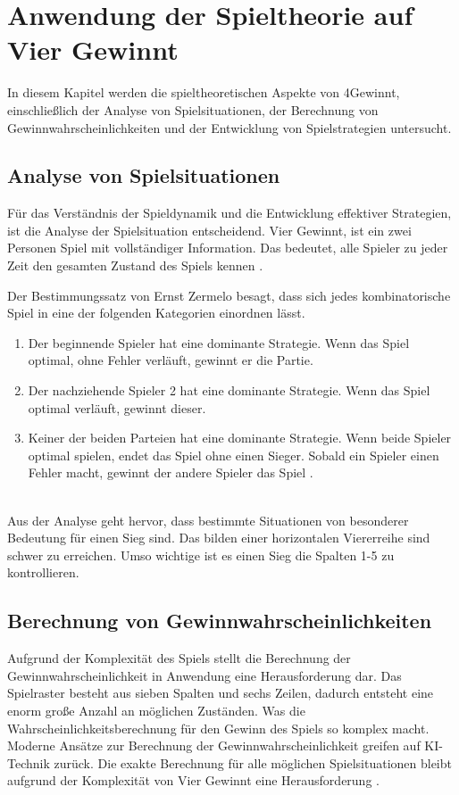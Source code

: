 \chapter{Anwendung der Spieltheorie auf Vier Gewinnt}
\label{cha:Anwendung der Spieltheorie auf Vier Gewinnt}
In diesem Kapitel werden die spieltheoretischen Aspekte von 4Gewinnt, einschließlich der Analyse von Spielsituationen, der Berechnung von Gewinnwahrscheinlichkeiten und der Entwicklung von Spielstrategien untersucht.


\section{Analyse von Spielsituationen}
\label{sec:Analyse von Spielsituationen}
Für das Verständnis der Spieldynamik und die Entwicklung effektiver Strategien, ist die Analyse der Spielsituation entscheidend.
Vier Gewinnt, ist ein zwei Personen Spiel mit vollständiger Information. Das bedeutet, alle Spieler zu jeder Zeit den gesamten Zustand des Spiels kennen \autocite{ruile2009viergewinnt}.

Der Bestimmungssatz von Ernst Zermelo besagt, dass sich jedes kombinatorische Spiel in eine der folgenden Kategorien einordnen lässt.
\begin{enumerate}
	\item  Der beginnende Spieler hat eine dominante Strategie. Wenn das Spiel optimal, ohne Fehler verläuft, gewinnt er die Partie.
	\item Der nachziehende Spieler 2 hat eine dominante Strategie. Wenn das Spiel optimal verläuft, gewinnt dieser.
	\item Keiner der beiden Parteien hat eine dominante Strategie. Wenn beide Spieler optimal spielen, endet das Spiel ohne einen Sieger. Sobald ein Spieler einen Fehler macht, gewinnt der andere Spieler das Spiel \autocite{mueller_2011}.
\end{enumerate}
\\

Aus der Analyse geht hervor, dass bestimmte Situationen von besonderer Bedeutung für einen Sieg sind.
Das bilden einer horizontalen Viererreihe sind schwer zu erreichen. Umso wichtige ist es einen Sieg die Spalten 1-5 zu kontrollieren. 


\section{Berechnung von Gewinnwahrscheinlichkeiten}
Aufgrund der Komplexität des Spiels stellt die Berechnung der Gewinnwahrscheinlichkeit in Anwendung eine Herausforderung dar. Das Spielraster besteht aus sieben Spalten und sechs Zeilen, dadurch entsteht eine enorm große Anzahl an möglichen Zuständen. Was die Wahrscheinlichkeitsberechnung für den Gewinn des Spiels so komplex macht.
Moderne Ansätze zur Berechnung der Gewinnwahrscheinlichkeit greifen auf KI-Technik zurück. Die exakte Berechnung für alle möglichen Spielsituationen bleibt aufgrund der Komplexität von Vier Gewinnt eine Herausforderung \autocite{ruile2009viergewinnt}.
